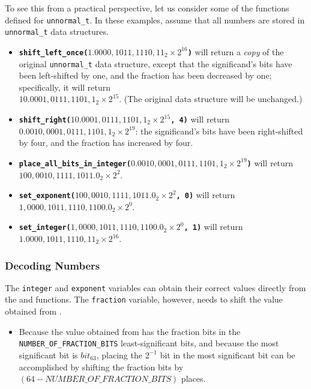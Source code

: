 To see this from a practical perspective, let us consider some of the functions defined for \lstinline{unnormal_t}.
In these examples, assume that all numbers are stored in \lstinline{unnormal_t} data structures.
\begin{itemize}
    \item \textbf{\texttt{shift\_left\_once($1.0000,1011,1110,11_{2} \times 2^{16}$)}} will return a \textit{copy} of the original \lstinline{unnormal_t} data structure, except that the significand's bits have been left-shifted by one, and the fraction has been decreased by one;
        specifically, it will return \\ $10.0001,0111,1101,1_{2} \times 2^{15}$.
        (The original data structure will be unchanged.)
    \item \textbf{\texttt{shift\_right($10.0001,0111,1101,1_{2} \times 2^{15}$, 4)}} will return \\
        $0.0010,0001,0111,1101,1_{2} \times 2^{19}$: the significand's bits have been right-shifted by four, and the fraction has increased by four.
    \item \textbf{\texttt{place\_all\_bits\_in\_integer($0.0010,0001,0111,1101,1_{2} \times 2^{19}$)}} will return \\
        $100,0010,1111,1011.0_{2} \times 2^{2}$.
    \item \textbf{\texttt{set\_exponent($100,0010,1111,1011.0_{2} \times 2^{2}$, 0)}} will return  \\
        $1,0000,1011,1110,1100.0_{2} \times 2^{0}$.
    \item \textbf{\texttt{set\_integer($1,0000,1011,1110,1100.0_{2} \times 2^{0}$, 1)}} will return  \\
        $1.0000,1011,1110,11_{2} \times 2^{16}$.
\end{itemize}


\subsubsection{Decoding Numbers}

The \lstinline{integer} and \lstinline{exponent} variables can obtain their correct values directly from the  and  functions.
The \lstinline{fraction} variable, however, needs to shift the value obtained from .

\begin{description}
    \begin{itemize}
        \item Because the value obtained from  has the fraction bits in the \lstinline{NUMBER_OF_FRACTION_BITS} least-significant bits,
            and because the most significant bit is $bit_{63}$, placing the $2^{-1}$ bit in the most significant bit can be accomplished by shifting the fraction bits by $(64 - NUMBER\_OF\_FRACTION\_BITS)$ places.
    \end{itemize}
\end{description}


